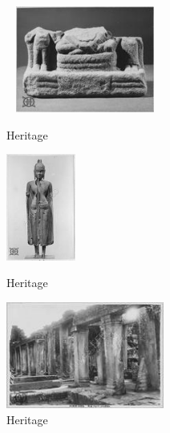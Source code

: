 \documentclass[hidelinks,12pt,a4paper]{report}
\begin{document}
\begin{figure}[!htb]
  \includegraphics[width=5.2cm, height=3.5cm, left]{images/sample/heritage_145}
  \captionsetup{labelformat=empty}
  \caption{Heritage}
\endminipage\hfill
{}
  \includegraphics[height=3.5cm, center]{images/sample/heritage_147}
  \captionsetup{labelformat=empty}
  \caption{Heritage}
\endminipage\hfill
{}%
  \includegraphics[width=5.2cm, height=3.5cm, right]{images/sample/heritage_282}
  \captionsetup{labelformat=empty}
  \caption{Heritage}
\endminipage
\end{figure}
\end{document}
